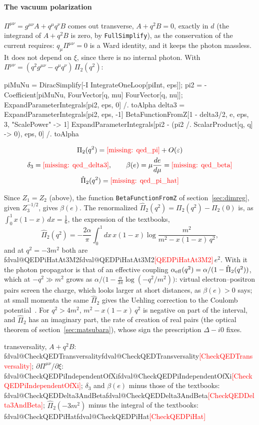 \documentclass[11pt,a4paper]{article}
\makeatletter
\newcommand{\formula}[1]{\IfFileExists{figures/formula_#1.tex}{}{\text{\textcolor{red}{[missing: \detokenize{#1}]}}}}
\newcommand{\pkg}[1]{\texttt{#1}}
\newcommand{\val}[1]{\ifcsname fdval@#1\endcsname\csname fdval@#1\endcsname\else\textcolor{red}{[#1]}\fi}
\makeatother
\begin{document}
\paragraph{The vacuum polarization} $\Pi^{\mu\nu}=g^{\mu\nu}A+q^\mu q^\nu B$ comes out transverse, $A+q^2B=0$, exactly in $d$
(the integrand of $A+q^2B$ is zero, by \pkg{FullSimplify}), as the conservation of the current requires: $q_\mu\Pi^{\mu\nu}=0$
is a Ward identity, and it keeps the photon massless. It does not depend on $\xi$, since there is no internal photon. With $\Pi^{\mu\nu}=(q^2g^{\mu\nu}-q^\mu q^\nu)\,\Pi_2(q^2)$:
\begin{code}
piMuNu = DiracSimplify[-I IntegrateOneLoop[piInt, eps]];
pi2 = -Coefficient[piMuNu, FourVector[q, mu] FourVector[q, nu]];
ExpandParameterIntegrals[pi2, eps, 0] /. toAlpha
delta3 = ExpandParameterIntegrals[pi2, eps, -1]
BetaFunctionFromZ[1 - delta3/2, e, eps, 3, "ScalePower" -> 1]
ExpandParameterIntegrals[pi2 - (pi2 /. ScalarProduct[q, q] -> 0), eps, 0] /. toAlpha
\end{code}
\begin{outputbox}
\vspace{-6pt}
\begin{gather*}
\Pi_2(q^2)=\formula{qed_pi}+O(\varepsilon)\\
\delta_3=\formula{qed_delta3},\qquad \beta(e)=\mu\frac{de}{d\mu}=\formula{qed_beta}\\
\hat\Pi_2(q^2)=\formula{qed_pi_hat}
\end{gather*}
\end{outputbox}
Since $Z_1=Z_2$ (above), the function \pkg{BetaFunctionFromZ} of section~\ref{sec:dimreg}, given $Z_3^{-1/2}$, gives
$\beta(e)$. The renormalized $\hat\Pi_2(q^2)=\Pi_2(q^2)-\Pi_2(0)$
is, as $\int_0^1x(1-x)\,dx=\frac16$, the expression of the textbooks,
\[
\hat\Pi_2(q^2)=-\frac{2\alpha}\pi\int_0^1dx\,x(1-x)\log\frac{m^2}{m^2-x(1-x)\,q^2},
\]
and at $q^2=-3m^2$ both are \val{QEDPiHatAt3M2}$\,e^2$. With it the photon propagator is that of an effective coupling
$\alpha_{\rm eff}(q^2)=\alpha/(1-\hat\Pi_2(q^2))$, which at $-q^2\gg m^2$ grows as
$\alpha/\bigl(1-\frac\alpha{3\pi}\log(-q^2/m^2)\bigr)$: virtual electron--positron pairs screen the charge, which looks larger
at short distances, as $\beta(e)>0$ says; at small momenta the same $\hat\Pi_2$ gives the Uehling correction to the
Coulomb potential~\cite[section~7.5]{PeskinSchroeder}. For $q^2>4m^2$, $m^2-x(1-x)\,q^2$ is negative on part of the
interval, and $\hat\Pi_2$ has an imaginary part, the rate of creation of real pairs (the optical theorem of
section~\ref{sec:matsubara}), whose sign the prescription $\Delta-i0$ fixes.
\begin{result}
transversality, $A+q^2B$: \val{CheckQEDTransversality}; $\partial\Pi^{\mu\nu}/\partial\xi$: \val{CheckQEDPiIndependentOfXi};
$\delta_3$ and $\beta(e)$ minus those of the textbooks: \val{CheckQEDDelta3AndBeta}; $\hat\Pi_2(-3m^2)$ minus the integral of
the textbooks: \val{CheckQEDPiHat}
\end{result}
\end{document}
